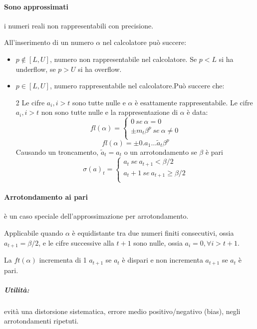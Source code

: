 \paragraph{Sono approssimati} i numeri reali non rappresentabili con precisione.

All'inserimento di un numero $\alpha$ nel calcolatore può succere:
\begin{itemize}
	\item \textbf{$p\notin[L, U]$}, numero non rappresentabile nel calcolatore. Se $p<L$ si ha underflow, se $p>U$ si ha overflow.
	\item \textbf{$p\in[L, U]$}, numero rappresentabile nel calcolatore.Può succere che:

	\begin{multicols}{2}
	Le cifre $a_i, i>t$ sono tutte nulle e $\alpha$ è esattamente rappresentabile.
	Le cifre $a_i, i>t$ non sono tutte nulle e la rappresentazione di $\alpha$ è data:
	\[fl(\alpha)=\begin{cases}
		0 \ se \ \alpha=0\\
		\pm m_t\beta^p \ se \ \alpha\ne0\\
	\end{cases}\]
	\[fl(\alpha)=\pm0.a_1\dots\tilde{a}_t\beta^p\]
	Causando un troncamento, $\tilde{a}_t=a_t$ o un arrotondamento se $\beta$ è pari \[\sigma(a)_t=\begin{cases}
		a_t \ se \ a_{t+1}<\beta/2\\
		a_t+1 \ se \ a_{t+1}\geqslant \beta/2\\
	\end{cases}\]
	\end{multicols}
\end{itemize}
\paragraph{Arrotondamento ai pari} è un caso speciale dell'approssimazione per arrotondamento.

Applicabile quando $\alpha$ è equidistante tra due numeri finiti consecutivi, ossia $a_{t+1}=\beta/2$, e le cifre successive alla $t+1$ sono nulle, ossia $a_i=0, \forall i > t+1$.

La $ft(\alpha)$ incrementa di 1 $a_{t+1}$ se $a_t$ è dispari e non incrementa $a_{t+1}$ se $a_t$ è pari.

\subparagraph{Utilità:} evità una distorsione sistematica, errore medio positivo/negativo (bias), negli arrotondamenti ripetuti.
